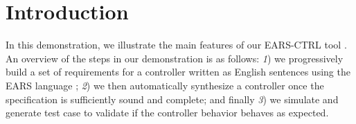 \vspace{-1cm}
\section{Introduction}
\label{sec:intro}
\vspace{-.3cm}
In this demonstration, we illustrate the main features of our \textsf{EARS-CTRL}
tool \cite{EARSProject}.
An overview of the steps in our demonstration is as follows: \emph{1}) we
progressively build a set of requirements for a controller written as English
sentences using the EARS language \cite{EARS}; \emph{2}) we then automatically
synthesize a controller once the specification is sufficiently sound and
complete; and finally \emph{3}) we simulate and generate test case to
validate if the controller behavior behaves as expected.